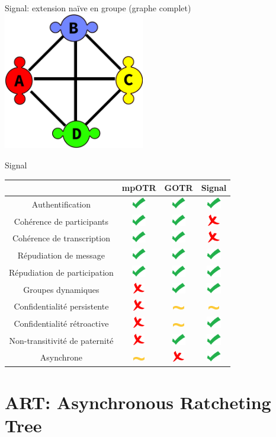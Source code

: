 \documentclass{beamer}
\newcommand{\okay}{\includegraphics[height=0.5cm]{img/check.png}}
\newcommand{\nope}{\includegraphics[height=0.5cm]{img/cross.png}}
\newcommand{\sortof}{\includegraphics[width=0.5cm]{img/tilde.png}}
\begin{document}
\begin{frame}{Signal: extension naïve en groupe (graphe complet)}
	\center
	\includegraphics[height=6cm]{img/group_p2p.png}
\end{frame}

\begin{frame}{Signal}
	\center
  	\begin{tabular}{c|ccc}
			                              & mpOTR   & GOTR    & Signal  \\
			\hline
  		Authentification              & \okay   & \okay   & \okay   \\
  		\hline
  		Cohérence de participants     & \okay   & \okay   & \nope   \\
  		Cohérence de transcription    & \okay   & \okay   & \nope   \\
  		\hline
  		Répudiation de message        & \okay   & \okay   & \okay   \\
  		Répudiation de participation  & \okay   & \okay   & \okay   \\
  		\hline
  		Groupes dynamiques            & \nope   & \okay   & \okay   \\
  		\hline
  		Confidentialité persistente   & \nope   & \sortof & \sortof \\
  		Confidentialité rétroactive   & \nope   & \sortof & \okay   \\
  		Non-transitivité de paternité & \nope   & \okay   & \okay   \\
  		\hline
  		Asynchrone                    & \sortof & \nope   & \okay
    \end{tabular}
\end{frame}

\section{ART: Asynchronous Ratcheting Tree}
\end{document}
